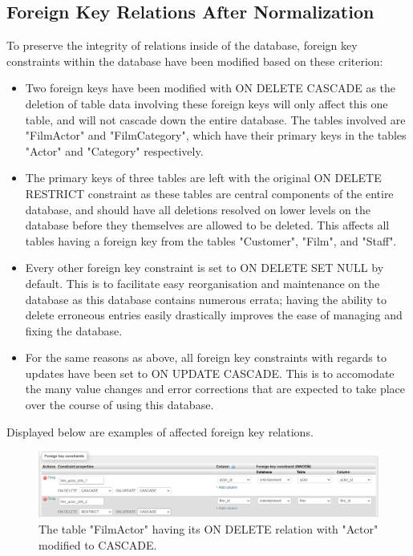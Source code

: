 \documentclass{article}
\begin{document}
	\subsection{Foreign Key Relations After Normalization}
		To preserve the integrity of relations inside of the database, foreign key constraints within the database have been modified based on these criterion:
		\begin{itemize}
			\item Two foreign keys have been modified with ON DELETE CASCADE as the deletion of table data involving these foreign keys will only affect this one table, and will not cascade down the entire database. The tables involved are "Film\textunderscore Actor" and "Film\textunderscore Category", which have their primary keys in the tables "Actor" and "Category" respectively. 
			\item The primary keys of three tables are left with the original ON DELETE RESTRICT constraint as these tables are central components of the entire database, and should have all deletions resolved on lower levels on the database before they themselves are allowed to be deleted. This affects all tables having a foreign key from the tables "Customer", "Film", and "Staff".
			\item Every other foreign key constraint is set to ON DELETE SET NULL by default. This is to facilitate easy reorganisation and maintenance on the database as this database contains numerous errata; having the ability to delete erroneous entries easily drastically improves the ease of managing and fixing the database.
			\item For the same reasons as above, all foreign key constraints with regards to updates have been set to ON UPDATE CASCADE. This is to accomodate the many value changes and error corrections that are expected to take place over the course of using this database. 
		\end{itemize}
		Displayed below are examples of affected foreign key relations.
		\begin{figure}[H]
			\includegraphics[width=\textwidth]{actor_cascade}
			\caption{The table "Film\textunderscore Actor" having its ON DELETE relation with "Actor" modified to CASCADE.}
		\end{figure}
\end{document}
